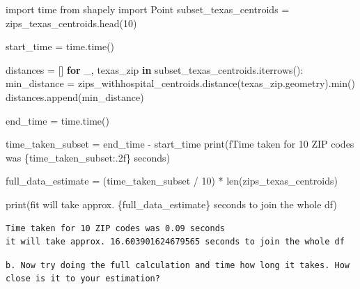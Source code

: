 \documentclass[
  letterpaper,
  DIV=11,
  numbers=noendperiod]{scrartcl}
\newenvironment{Shaded}{\begin{snugshade}}{\end{snugshade}}
\newcommand{\BuiltInTok}[1]{\textcolor[rgb]{0.00,0.23,0.31}{#1}}
\newcommand{\ControlFlowTok}[1]{\textcolor[rgb]{0.00,0.23,0.31}{\textbf{#1}}}
\newcommand{\DecValTok}[1]{\textcolor[rgb]{0.68,0.00,0.00}{#1}}
\newcommand{\ImportTok}[1]{\textcolor[rgb]{0.00,0.46,0.62}{#1}}
\newcommand{\KeywordTok}[1]{\textcolor[rgb]{0.00,0.23,0.31}{\textbf{#1}}}
\newcommand{\NormalTok}[1]{\textcolor[rgb]{0.00,0.23,0.31}{#1}}
\newcommand{\OperatorTok}[1]{\textcolor[rgb]{0.37,0.37,0.37}{#1}}
\newcommand{\SpecialCharTok}[1]{\textcolor[rgb]{0.37,0.37,0.37}{#1}}
\newcommand{\SpecialStringTok}[1]{\textcolor[rgb]{0.13,0.47,0.30}{#1}}
\begin{document}
\begin{Shaded}
\begin{Highlighting}[]
\ImportTok{import}\NormalTok{ time}
\ImportTok{from}\NormalTok{ shapely }\ImportTok{import}\NormalTok{ Point}
\NormalTok{subset\_texas\_centroids }\OperatorTok{=}\NormalTok{ zips\_texas\_centroids.head(}\DecValTok{10}\NormalTok{)}

\NormalTok{start\_time }\OperatorTok{=}\NormalTok{ time.time()}

\NormalTok{distances }\OperatorTok{=}\NormalTok{ []}
\ControlFlowTok{for}\NormalTok{ \_, texas\_zip }\KeywordTok{in}\NormalTok{ subset\_texas\_centroids.iterrows():}
\NormalTok{    min\_distance }\OperatorTok{=}\NormalTok{ zips\_withhospital\_centroids.distance(texas\_zip.geometry).}\BuiltInTok{min}\NormalTok{()}
\NormalTok{    distances.append(min\_distance)}


\NormalTok{end\_time }\OperatorTok{=}\NormalTok{ time.time()}

\NormalTok{time\_taken\_subset }\OperatorTok{=}\NormalTok{ end\_time }\OperatorTok{{-}}\NormalTok{ start\_time}
\BuiltInTok{print}\NormalTok{(}\SpecialStringTok{f\textquotesingle{}Time taken for 10 ZIP codes was }\SpecialCharTok{\{}\NormalTok{time\_taken\_subset}\SpecialCharTok{:.2f\}}\SpecialStringTok{ seconds\textquotesingle{}}\NormalTok{)}

\NormalTok{full\_data\_estimate }\OperatorTok{=}\NormalTok{ (time\_taken\_subset }\OperatorTok{/} \DecValTok{10}\NormalTok{) }\OperatorTok{*} \BuiltInTok{len}\NormalTok{(zips\_texas\_centroids)}

\BuiltInTok{print}\NormalTok{(}\SpecialStringTok{f\textquotesingle{}it will take approx. }\SpecialCharTok{\{}\NormalTok{full\_data\_estimate}\SpecialCharTok{\}}\SpecialStringTok{ seconds to join the whole df\textquotesingle{}}\NormalTok{)}
\end{Highlighting}
\end{Shaded}

\begin{verbatim}
Time taken for 10 ZIP codes was 0.09 seconds
it will take approx. 16.603901624679565 seconds to join the whole df
\end{verbatim}

\begin{verbatim}
b. Now try doing the full calculation and time how long it takes. How close is it to your estimation?
\end{verbatim}
\end{document}
